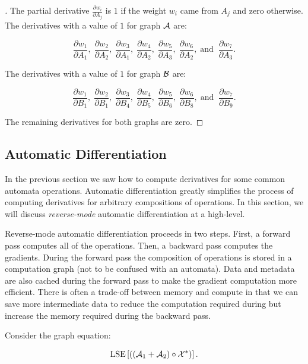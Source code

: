 \begin{proof}[\unskip\nopunct]
The partial derivative $\frac{\partial w_i}{\partial A_j}$ is $1$ if the weight
$w_i$ came from $A_j$ and zero otherwise. The derivatives with a value of $1$
for graph $\mathcal{A}$ are:

$$
\frac{\partial w_1}{\partial A_1}, \; \frac{\partial w_2}{\partial A_2}, \;
    \frac{\partial w_3}{\partial A_1}, \; \frac{\partial w_4}{\partial A_2}, \;
    \frac{\partial w_5}{\partial A_3}, \; \frac{\partial w_6}{\partial A_2}, \;
    \textrm{and} \;\; \frac{\partial w_7}{\partial A_3}.
$$

The derivatives with a value of $1$ for graph $\mathcal{B}$ are:

$$
\frac{\partial w_1}{\partial B_1}, \; \frac{\partial w_2}{\partial B_1}, \;
    \frac{\partial w_3}{\partial B_4}, \; \frac{\partial w_4}{\partial B_5}, \;
    \frac{\partial w_5}{\partial B_6}, \; \frac{\partial w_6}{\partial B_8}, \;
    \textrm{and} \;\; \frac{\partial w_7}{\partial B_9}.
$$

The remaining derivatives for both graphs are zero.
\end{proof}

\subsection{Automatic Differentiation}

In the previous section we saw how to compute derivatives for some common
automata operations. Automatic differentiation greatly simplifies the process
of computing derivatives for arbitrary compositions of operations. In this
section, we will discuss \emph{reverse-mode} automatic differentiation at a
high-level.

Reverse-mode automatic differentiation proceeds in two steps. First, a forward
pass computes all of the operations. Then, a backward pass computes the
gradients. During the forward pass the composition of operations is stored in a
computation graph (not to be confused with an automata). Data and metadata are
also cached during the forward pass to make the gradient computation more
efficient. There is often a trade-off between memory and compute in that we can
save more intermediate data to reduce the computation required during but
increase the memory required during the backward pass.

Consider the graph equation:

\begin{equation}
    \label{eq:compute_graph}
    \operatorname*{\textrm{LSE}}\left[ \left(\left(\mathcal{A}_1 + \mathcal{A}_2\right) \circ \mathcal{X}^*\right) \right].
\end{equation}


